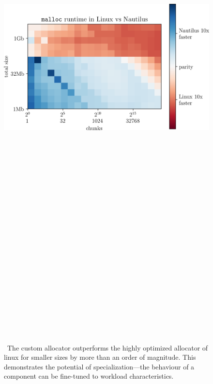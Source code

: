 \begin{figure}
  \vspace{-1cm}
  \includegraphics[height=34cm]{plots/malloc.png}
  \vspace{-1cm}
  \label{fig:malloc}
  \caption{~The custom allocator outperforms the highly optimized allocator of linux for smaller sizes by more than an order of magnitude. This demonstrates the potential of specialization---the behaviour of a component can be fine-tuned to workload characteristics.}
\end{figure}

